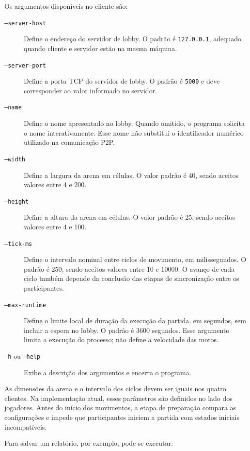 \documentclass[11pt,a4paper]{article}
\begin{document}
\begin{description}
Os argumentos disponíveis no cliente são:

\begin{description}
    \item[\texttt{--server-host}] Define o endereço do servidor de lobby. O padrão é \texttt{127.0.0.1}, adequado quando cliente e servidor estão na mesma máquina.

    \item[\texttt{--server-port}] Define a porta TCP do servidor de lobby. O padrão é \texttt{5000} e deve corresponder ao valor informado no servidor.

    \item[\texttt{--name}] Define o nome apresentado no lobby. Quando omitido, o programa solicita o nome interativamente. Esse nome não substitui o identificador numérico utilizado na comunicação P2P.

    \item[\texttt{--width}] Define a largura da arena em células. O valor padrão é 40, sendo aceitos valores entre 4 e 200.

    \item[\texttt{--height}] Define a altura da arena em células. O valor padrão é 25, sendo aceitos valores entre 4 e 100.

    \item[\texttt{--tick-ms}] Define o intervalo nominal entre ciclos de movimento, em milissegundos. O padrão é 250, sendo aceitos valores entre 10 e 10000. O avanço de cada ciclo também depende da conclusão das etapas de sincronização entre os participantes.

    \item[\texttt{--max-runtime}] Define o limite local de duração da execução da partida, em segundos, sem incluir a espera no lobby. O padrão é 3600 segundos. Esse argumento limita a execução do processo; não define a velocidade das motos.

    \item[\texttt{-h} ou \texttt{--help}] Exibe a descrição dos argumentos e encerra o programa.
\end{description}

As dimensões da arena e o intervalo dos ciclos devem ser iguais nos quatro clientes. Na implementação atual, esses parâmetros são definidos no lado dos jogadores. Antes do início dos movimentos, a etapa de preparação compara as configurações e impede que participantes iniciem a partida com estados iniciais incompatíveis.

Para salvar um relatório, por exemplo, pode-se executar:


\end{description}
\end{document}
